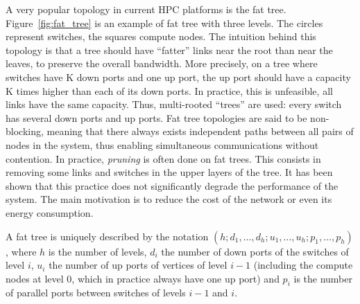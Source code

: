 \documentclass[12pt, a4paper]{memoir}
\begin{document}
A very popular topology in current HPC platforms is the fat tree\cite{Zahavi10}. Figure~\ref{fig:fat_tree} is an
example of fat tree with three levels. The circles represent switches, the squares compute nodes. The intuition
behind this topology is that a tree should have “fatter” links near the root than near the leaves, to preserve the
overall bandwidth. More precisely, on a tree where switches have K down ports and one up port, the up port should
have a capacity K times higher than each of its down ports. In practice, this is unfeasible, all links have the same
capacity. Thus, multi-rooted “trees” are used: every switch has several down ports and up ports. Fat tree topologies
are said to be non-blocking, meaning that there always exists independent paths between all pairs of nodes in the
system, thus enabling simultaneous communications without contention. In practice\cite{conf/cluster/DesaiBSI08},
\emph{pruning} is often done on fat trees. This consists in removing some links and switches in the upper layers of the
tree. It has been shown\cite{Leon:2016:CPS:3014904.3015009} that this practice does not significantly degrade the performance of the system. The main
motivation is to reduce the cost of the network or even its energy consumption.

A fat tree is uniquely described by the notation \((h ; d_1,\dots,d_h ; u_1,\dots,u_h ; p_1,\dots,p_h)\), where \(h\) is the number
of levels, \(d_i\) the number of down ports of the switches of level \(i\), \(u_i\) the number of up ports of vertices of
level \(i-1\) (including the compute nodes at level \(0\), which in practice always have one up port) and \(p_i\) is the
number of parallel ports between switches of levels \(i-1\) and \(i\).
\end{document}

